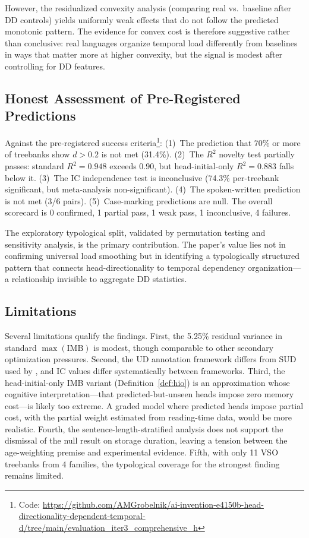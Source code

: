 \documentclass[11pt,letterpaper]{article}
\begin{document}
However, the residualized convexity analysis (comparing real vs.\ baseline after DD controls) yields uniformly weak effects that do not follow the predicted monotonic pattern. The evidence for convex cost is therefore suggestive rather than conclusive: real languages organize temporal load differently from baselines in ways that matter more at higher convexity, but the signal is modest after controlling for DD features.

\subsection{Honest Assessment of Pre-Registered Predictions}

Against the pre-registered success criteria\footnote{Code: \url{https://github.com/AMGrobelnik/ai-invention-e4150b-head-directionality-dependent-temporal-d/tree/main/evaluation_iter3_comprehensive_h}}: (1)~The prediction that 70\% or more of treebanks show $d > 0.2$ is not met (31.4\%). (2)~The $R^2$ novelty test partially passes: standard $R^2 = 0.948$ exceeds 0.90, but head-initial-only $R^2 = 0.883$ falls below it. (3)~The IC independence test is inconclusive (74.3\% per-treebank significant, but meta-analysis non-significant). (4)~The spoken-written prediction is not met (3/6 pairs). (5)~Case-marking predictions are null. The overall scorecard is 0 confirmed, 1 partial pass, 1 weak pass, 1 inconclusive, 4 failures.

The exploratory typological split, validated by permutation testing and sensitivity analysis, is the primary contribution. The paper's value lies not in confirming universal load smoothing but in identifying a typologically structured pattern that connects head-directionality to temporal dependency organization---a relationship invisible to aggregate DD statistics.

\subsection{Limitations}

Several limitations qualify the findings. First, the 5.25\% residual variance in standard $\max(\text{IMB})$ is modest, though comparable to other secondary optimization pressures. Second, the UD annotation framework differs from SUD used by \citet{Yadav2022}, and IC values differ systematically between frameworks. Third, the head-initial-only IMB variant (Definition~\ref{def:hio}) is an approximation whose cognitive interpretation---that predicted-but-unseen heads impose zero memory cost---is likely too extreme. A graded model where predicted heads impose partial cost, with the partial weight estimated from reading-time data, would be more realistic. Fourth, the sentence-length-stratified analysis does not support the dismissal of the \citet{Chen2005} null result on storage duration, leaving a tension between the age-weighting premise and experimental evidence. Fifth, with only 11 VSO treebanks from 4 families, the typological coverage for the strongest finding remains limited.
\end{document}
